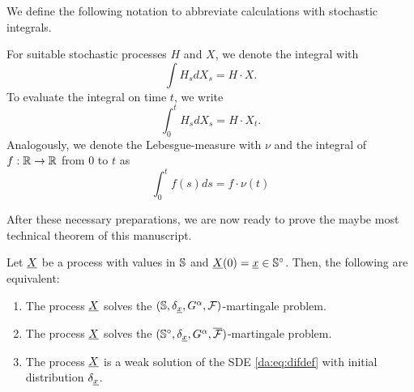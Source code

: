 \noindent
We define the following notation to abbreviate calculations with stochastic integrals.  

\begin{Notation}
For suitable stochastic processes $H$ and $X$, we denote the \Ito integral with
\[ \int H_s d X_s = H \cdot X. \] 
To evaluate the integral on time $t$, we write
\[ \int_0^t H_s d X_s = H \cdot X_t. \]
Analogously, we denote the Lebesgue-measure with $\nu$ and the integral of $f: \mathbb{R} \to \mathbb{R}$ from $0$
to $t$ as
\[ \int_0^t f(s) ds = f \cdot \nu(t) \]
\end{Notation}

\noindent
After these necessary preparations, we are now ready to prove the maybe most technical theorem of
this manuscript.

\begin{samepage}
\begin{Theorem} \label{da:t:SDE=MP}
Let $\underline{X}$ be a process with values in $\mathbb{S}$ and $\underline{X} \! \left( 0 \right) = \underline{x} \in
\mathbb{S}^\circ$. Then, the following are equivalent:
\begin{enumerate}
\item The process $\underline{X}$ solves the $(\mathbb{S},\delta_{\underline{x}},G^{\alpha},\mathcal{F})$-martingale problem.
\item The process $\underline{X}$ solves the
$(\mathbb{S}^\circ,\delta_{\underline{x}},G^{\alpha},\overline{\mathcal{F}})$-martingale problem.
\item The process $\underline{X}$ is a weak solution of the SDE \eqref{da:eq:difdef} with initial
distribution $\delta_{\underline{x}}$.
\end{enumerate}
\end{Theorem}
\end{samepage}

